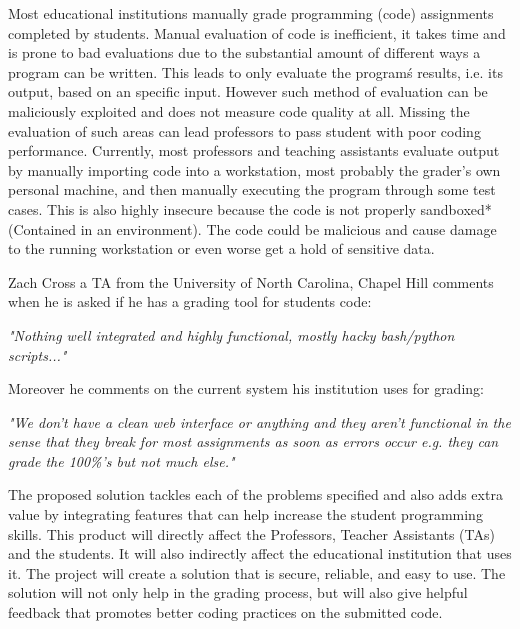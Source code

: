 
Most educational institutions manually grade programming (code) assignments
completed by students. Manual evaluation of code is inefficient, it takes time
and is prone to bad evaluations due to the substantial amount of different ways
a program can be written. This leads to only evaluate the program\'s results,
i.e. its output, based on an specific input. However such method of evaluation
can be maliciously exploited and does not measure code quality at all. Missing
the evaluation of such areas can lead professors to pass student with poor
coding performance. Currently, most professors and teaching assistants evaluate
output by manually importing code into a workstation, most probably the grader's
own personal machine, and then manually executing the program through some test
cases. This is also highly insecure because the code is not properly sandboxed*
(Contained in an environment). The code could be malicious and cause damage to
the running workstation or even worse get a hold of sensitive data.

Zach Cross a TA from the University of North Carolina, Chapel Hill comments when
he is asked if he has a grading tool for students code:

\textit{"Nothing well integrated and highly functional, mostly hacky bash/python
scripts..."}

Moreover he comments on the current system his institution uses for grading:

\textit{"We don't have a clean web interface or anything and they aren't
functional in the sense that they break for most assignments as soon as errors
occur e.g. they can grade the 100\%'s but not much else."}

The proposed solution tackles each of the problems specified and also adds
extra value by integrating features that can help increase the student
programming skills. This product will directly affect the Professors, Teacher
Assistants (TAs) and the students. It will also indirectly affect the
educational institution that uses it. The project will create a solution that
is secure, reliable, and easy to use. The solution will not only help in the grading process,
but will also give helpful feedback that promotes better coding practices on the
submitted code.
